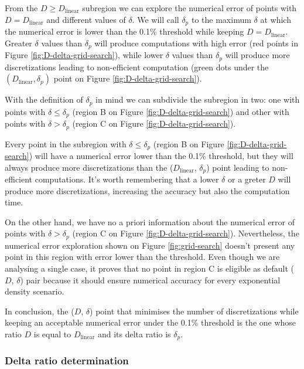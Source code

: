 \documentclass[extra]{gji}
\begin{document}
From the $D \ge D_\text{linear}$ subregion we can explore the numerical
error of points with $D = D_\text{linear}$ and different values of
$\delta$.
We will call $\delta_p$ to the maximum $\delta$ at which the numerical
error is lower than the 0.1\% threshold while keeping
$D = D_ \text{linear}$.
Greater $\delta$ values than $\delta_p$ will produce computations with
high error (red points in Figure \ref{fig:D-delta-grid-search}), while
lower $\delta$ values than $\delta_p$ will produce more discretizations
leading to non-efficient computation (green dots under the
$(D_\text{linear}, \delta_p)$ point on Figure \ref{fig:D-delta-grid-search}).

With the definition of $\delta_p$ in mind we can subdivide the
subregion in two: one with points with $\delta \le \delta_p$ (region B
on Figure \ref{fig:D-delta-grid-search}) and other with points with
$\delta > \delta_p$ (region C on Figure \ref{fig:D-delta-grid-search}).

Every point in the subregion with $\delta \le \delta_p$ (region B on
Figure \ref{fig:D-delta-grid-search}) will have a numerical error lower
than the 0.1\% threshold, but they will always produce more
discretizations than the ($D_\text{linear}$, $\delta_p$) point leading
to non-efficient computations.
It's worth remembering that a lower $\delta$ or a greter $D$ will
produce more discretizations, increasing the accuracy but also the
computation time.

On the other hand, we have no a priori information about the numerical
error of points with $\delta > \delta_p$ (region C on
Figure \ref{fig:D-delta-grid-search}).
Nevertheless, the numerical error exploration shown on
Figure \ref{fig:grid-search} doesn't present any
point in this region with error lower than the threshold.
Even though we are analysing a single case, it proves that no point in
region C is eligible as default ($D$, $\delta$) pair because it should
ensure numerical accuracy for every exponential density scenario.

In conclusion, the ($D$, $\delta$) point that minimises the number of
discretizations while keeping an acceptable numerical error under the
0.1\% threshold is the one whose ratio $D$ is equal to
$D_\text{linear}$ and its delta ratio is $\delta_p$.

\subsubsection{Delta ratio determination}
\end{document}

